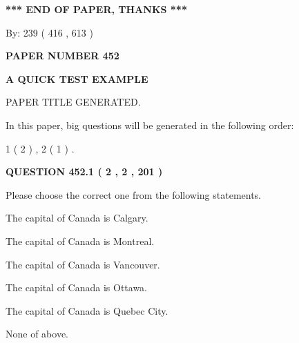 \documentclass[12pt]{article}
\begin{document}
   
   
   
\vspace{1.0in} 
{\textbf{\large{ *** END OF PAPER, THANKS *** }}} 
   
   
\hspace{1.0in} By: 
 239 ( 416 ,  613 )
   
   
   
   
\newpage 
\setcounter{page}{ 
   452001 } 
   
   
   
   
 {\textbf{ \Large{ PAPER NUMBER  452  }}}
   
   
\vspace{0.2in}
   
   
   
   
   
   
   
   
 \vspace{0.2in}
{\LARGE {\textbf{ A QUICK TEST EXAMPLE}}}
   
   
 PAPER TITLE GENERATED.
   
   
   
\vspace{0.2in}
   
In this paper, big questions will be generated in the following order: 
   
   
   1 ( 2 )
 ,
   2 ( 1 )
 .
  
\vspace{0.2in}
  
{\textbf{\Large{QUESTION
452.1 
 ( 2 , 2 , 201 )
}}}
  
  
Please choose the correct one from the following statements.
 
 
The capital of Canada is Calgary.
 
 
The capital of Canada is Montreal.
 
 
The capital of Canada is Vancouver.
 
 
The capital of Canada is Ottawa.
 
 
The capital of Canada is Quebec City.
 
 
 None of above.
 
 
\noindent{}
 
\end{document}
